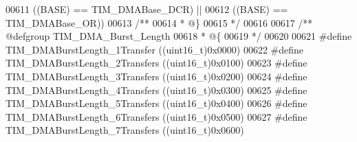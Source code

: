 \begin{DoxyCode}
00611                                \textcolor{preprocessor}{(}\textcolor{preprocessor}{(}\textcolor{preprocessor}{BASE}\textcolor{preprocessor}{)} \textcolor{preprocessor}{==} TIM_DMABase_DCR\textcolor{preprocessor}{)} \textcolor{preprocessor}{||}
00612                                \textcolor{preprocessor}{(}\textcolor{preprocessor}{(}\textcolor{preprocessor}{BASE}\textcolor{preprocessor}{)} \textcolor{preprocessor}{==} TIM_DMABase_OR\textcolor{preprocessor}{)}\textcolor{preprocessor}{)}
00613 \textcolor{comment}{/**}
00614 \textcolor{comment}{  * @\}}
00615 \textcolor{comment}{  */}
00616 
00617 \textcolor{comment}{/** @defgroup TIM\_DMA\_Burst\_Length }
00618 \textcolor{comment}{  * @\{}
00619 \textcolor{comment}{  */}
00620 
00621 \textcolor{preprocessor}{#}\textcolor{preprocessor}{define} \textcolor{preprocessor}{TIM\_DMABurstLength\_1Transfer}           \textcolor{preprocessor}{(}\textcolor{preprocessor}{(}\textcolor{preprocessor}{uint16\_t}\textcolor{preprocessor}{)}0x0000\textcolor{preprocessor}{)}
00622 \textcolor{preprocessor}{#}\textcolor{preprocessor}{define} \textcolor{preprocessor}{TIM\_DMABurstLength\_2Transfers}          \textcolor{preprocessor}{(}\textcolor{preprocessor}{(}\textcolor{preprocessor}{uint16\_t}\textcolor{preprocessor}{)}0x0100\textcolor{preprocessor}{)}
00623 \textcolor{preprocessor}{#}\textcolor{preprocessor}{define} \textcolor{preprocessor}{TIM\_DMABurstLength\_3Transfers}          \textcolor{preprocessor}{(}\textcolor{preprocessor}{(}\textcolor{preprocessor}{uint16\_t}\textcolor{preprocessor}{)}0x0200\textcolor{preprocessor}{)}
00624 \textcolor{preprocessor}{#}\textcolor{preprocessor}{define} \textcolor{preprocessor}{TIM\_DMABurstLength\_4Transfers}          \textcolor{preprocessor}{(}\textcolor{preprocessor}{(}\textcolor{preprocessor}{uint16\_t}\textcolor{preprocessor}{)}0x0300\textcolor{preprocessor}{)}
00625 \textcolor{preprocessor}{#}\textcolor{preprocessor}{define} \textcolor{preprocessor}{TIM\_DMABurstLength\_5Transfers}          \textcolor{preprocessor}{(}\textcolor{preprocessor}{(}\textcolor{preprocessor}{uint16\_t}\textcolor{preprocessor}{)}0x0400\textcolor{preprocessor}{)}
00626 \textcolor{preprocessor}{#}\textcolor{preprocessor}{define} \textcolor{preprocessor}{TIM\_DMABurstLength\_6Transfers}          \textcolor{preprocessor}{(}\textcolor{preprocessor}{(}\textcolor{preprocessor}{uint16\_t}\textcolor{preprocessor}{)}0x0500\textcolor{preprocessor}{)}
00627 \textcolor{preprocessor}{#}\textcolor{preprocessor}{define} \textcolor{preprocessor}{TIM\_DMABurstLength\_7Transfers}          \textcolor{preprocessor}{(}\textcolor{preprocessor}{(}\textcolor{preprocessor}{uint16\_t}\textcolor{preprocessor}{)}0x0600\textcolor{preprocessor}{)}

\end{DoxyCode}
